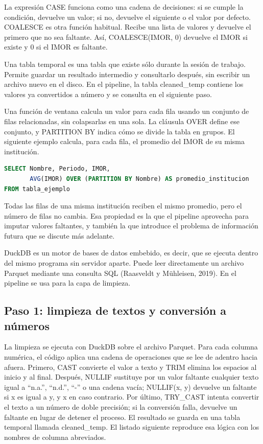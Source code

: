 La expresión CASE funciona como una cadena de decisiones: si se cumple la condición, devuelve un valor; si no, devuelve el siguiente o el valor por defecto. COALESCE es otra función habitual. Recibe una lista de valores y devuelve el primero que no sea faltante. Así, COALESCE(IMOR, 0) devuelve el IMOR si existe y 0 si el IMOR es faltante.

Una tabla temporal es una tabla que existe sólo durante la sesión de trabajo. Permite guardar un resultado intermedio y consultarlo después, sin escribir un archivo nuevo en el disco. En el pipeline, la tabla cleaned\_temp contiene los valores ya convertidos a número y se consulta en el siguiente paso.

Una función de ventana calcula un valor para cada fila usando un conjunto de filas relacionadas, sin colapsarlas en una sola. La cláusula OVER define ese conjunto, y PARTITION BY indica cómo se divide la tabla en grupos. El siguiente ejemplo calcula, para cada fila, el promedio del IMOR de su misma institución.

\begin{lstlisting}[language=SQL, caption={Ejemplo mínimo de función de ventana por institución}, label={lst:met_sql_ventana}]
SELECT Nombre, Periodo, IMOR,
       AVG(IMOR) OVER (PARTITION BY Nombre) AS promedio_institucion
FROM tabla_ejemplo
\end{lstlisting}

Todas las filas de una misma institución reciben el mismo promedio, pero el número de filas no cambia. Esa propiedad es la que el pipeline aprovecha para imputar valores faltantes, y también la que introduce el problema de información futura que se discute más adelante.

DuckDB es un motor de bases de datos embebido, es decir, que se ejecuta dentro del mismo programa sin servidor aparte. Puede leer directamente un archivo Parquet mediante una consulta SQL (Raasveldt y Mühleisen, 2019). En el pipeline se usa para la capa de limpieza.

\subsection{Paso 1: limpieza de textos y conversión a números}
La limpieza se ejecuta con DuckDB sobre el archivo Parquet. Para cada columna numérica, el código aplica una cadena de operaciones que se lee de adentro hacia afuera. Primero, CAST convierte el valor a texto y TRIM elimina los espacios al inicio y al final. Después, NULLIF sustituye por un valor faltante cualquier texto igual a ``n.a.'', ``n.d.'', ``-'' o una cadena vacía; NULLIF(x, y) devuelve un faltante si x es igual a y, y x en caso contrario. Por último, TRY\_CAST intenta convertir el texto a un número de doble precisión; si la conversión falla, devuelve un faltante en lugar de detener el proceso. El resultado se guarda en una tabla temporal llamada cleaned\_temp. El listado siguiente reproduce esa lógica con los nombres de columna abreviados.


